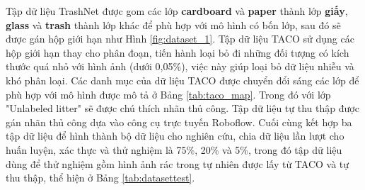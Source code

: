 \documentclass[../the.tex]{subfiles}
\begin{document}
{\fontsize{13}{12} \selectfont

	Tập dữ liệu TrashNet được gom các lớp \textbf{cardboard} và \textbf{paper} thành lớp \textbf{giấy}, \textbf{glass} và \textbf{trash} thành lớp khác để phù hợp với mô hình có bốn lớp, sau đó sẽ được gán hộp giới hạn như Hình \ref{fig:dataset_1}.
	Tập dữ liệu TACO sử dụng các hộp giới hạn thay cho phân đoạn, tiến hành loại bỏ đi những đối tượng có kích thước quá nhỏ với hình ảnh (dưới 0,05\%), việc này giúp loại bỏ dữ liệu nhiễu và khó phân loại.
	Các danh mục của dữ liệu TACO được chuyển đổi sáng các lớp để phù hợp với mô hình được mô tả ở Bảng  \ref{tab:taco_map}.
	Trong đó với lớp "Unlabeled litter" sẽ được chú thích nhãn thủ công.
	Tập dữ liệu tự thu thập được gán nhãn thủ công dựa vào công cụ trực tuyến Roboflow.
	Cuối cùng kết hợp ba tập dữ liệu để hình thành bộ dữ liệu cho nghiên cứu, chia dữ liệu lần lượt cho huấn luyện, xác thực và thử nghiệm là 75\%, 20\% và 5\%, trong đó tập dữ liệu dùng để thử nghiệm gồm hình ảnh rác trong tự nhiên được lấy từ TACO và tự thu thập, thể hiện ở Bảng \ref{tab:datasettest}.

}
\end{document}
